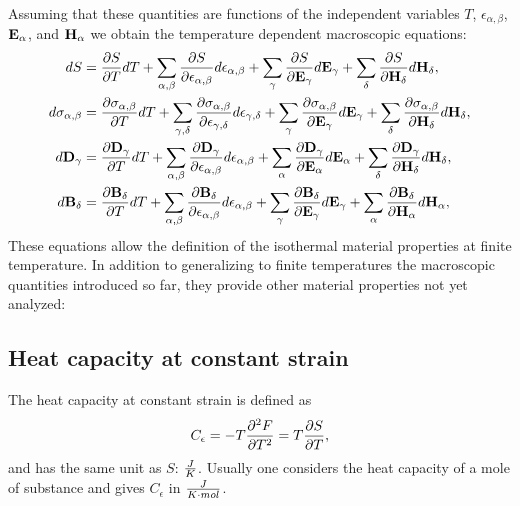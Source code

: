 \documentclass[12pt,a4paper]{article}
\begin{document}
Assuming that these quantities are functions of the independent variables
$T$, $\epsilon_{\alpha,\beta}$, ${\bf E}_\alpha$, and ${\bf H}_\alpha$ we
obtain the temperature dependent macroscopic equations:
\begin{align}
dS&= {\partial S \over \partial T} dT+\sum_{\alpha,\beta}
{\partial S \over \partial \epsilon_{\alpha,\beta}}d\epsilon_{\alpha,\beta}
+\sum_\gamma{\partial S \over \partial {\bf E}_{\gamma}}d{\bf E}_{\gamma}+ 
\sum_\delta{\partial S \over \partial {\bf H}_{\delta}}d{\bf H}_{\delta}, \\
d\sigma_{\alpha,\beta}&=
{\partial \sigma_{\alpha,\beta} \over \partial T} dT+\sum_{\gamma,\delta}
{\partial \sigma_{\alpha,\beta} \over \partial 
\epsilon_{\gamma,\delta}}d\epsilon_{\gamma,\delta}
+\sum_\gamma{\partial \sigma_{\alpha,\beta} \over \partial 
{\bf E}_{\gamma}}d{\bf E}_{\gamma}+ 
\sum_\delta{\partial \sigma_{\alpha,\beta} \over \partial 
{\bf H}_{\delta}}d{\bf H}_{\delta}, \\
d{\bf D}_\gamma&=
{\partial  {\bf D}_\gamma \over \partial T} dT+\sum_{\alpha,\beta}
{\partial {\bf D}_\gamma \over \partial \epsilon_{\alpha,\beta}}
d\epsilon_{\alpha,\beta}
+\sum_\alpha{\partial {\bf D}_\gamma \over \partial {\bf E}_{\alpha}}d{\bf E}_{\alpha}+ 
\sum_\delta{\partial {\bf D}_\gamma \over \partial {\bf H}_{\delta}}d{\bf H}_{\delta}, \\
d{\bf B}_\delta&=
{\partial {\bf B}_\delta \over \partial T} dT+\sum_{\alpha,\beta}
{\partial {\bf B}_\delta \over \partial \epsilon_{\alpha,\beta}}
d\epsilon_{\alpha,\beta}
+\sum_\gamma{\partial {\bf B}_\delta \over \partial {\bf E}_{\gamma}}
d{\bf E}_{\gamma}+ 
\sum_\alpha{\partial {\bf B}_\delta \over \partial {\bf H}_{\alpha}}
d{\bf H}_{\alpha}, 
\end{align}
These equations allow the definition of the isothermal material properties 
at finite temperature. In addition to generalizing to finite temperatures
the macroscopic quantities introduced so far, they provide other material 
properties not yet analyzed:

\subsection{Heat capacity at constant strain}
The heat capacity at constant strain is defined as
\begin{equation}
C_\epsilon= - T {\partial^2 F \over \partial T^2} = 
T {\partial S \over \partial T},
\end{equation}
and has the same unit as $S$: $J\over K$. Usually one considers the heat
capacity of a mole of substance and gives $C_\epsilon$ in 
${J\over K \cdot mol}$.
\end{document}

